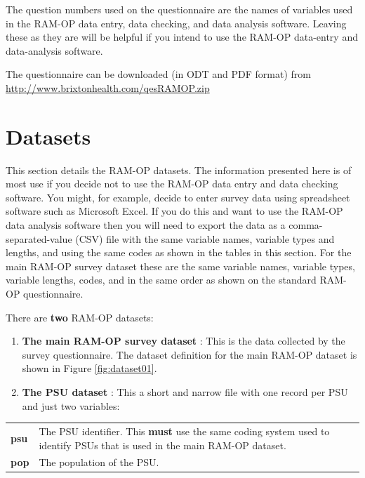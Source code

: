 \documentclass[12pt,a4paper]{book}
\theoremstyle{definition}
\theoremstyle{definition}
\theoremstyle{definition}
\theoremstyle{remark}
\begin{document}
The question numbers used on the questionnaire are the names of
variables used in the RAM-OP data entry, data checking, and data
analysis software. Leaving these as they are will be helpful if you
intend to use the RAM-OP data-entry and data-analysis software.

The questionnaire can be downloaded (in ODT and PDF format) from
\url{http://www.brixtonhealth.com/qesRAMOP.zip}

\hypertarget{datasets}{%
\chapter{Datasets}\label{datasets}}

This section details the RAM-OP datasets. The information presented here
is of most use if you decide not to use the RAM-OP data entry and data
checking software. You might, for example, decide to enter survey data
using spreadsheet software such as Microsoft Excel. If you do this and
want to use the RAM-OP data analysis software then you will need to
export the data as a comma-separated-value (CSV) file with the same
variable names, variable types and lengths, and using the same codes as
shown in the tables in this section. For the main RAM-OP survey dataset
these are the same variable names, variable types, variable lengths,
codes, and in the same order as shown on the standard RAM-OP
questionnaire.

There are \textbf{two} RAM-OP datasets:

\begin{enumerate}
\def\labelenumi{\arabic{enumi}.}
\item
  \textbf{The main RAM-OP survey dataset} : This is the data collected
  by the survey questionnaire. The dataset definition for the main
  RAM-OP dataset is shown in Figure \ref{fig:dataset01}.
\item
  \textbf{The PSU dataset} : This a short and narrow file with one
  record per PSU and just two variables:
\end{enumerate}

\begin{longtable}[]{@{}ll@{}}
\toprule
\begin{minipage}[t]{0.11\columnwidth}\raggedright
\textbf{psu}\strut
\end{minipage} & \begin{minipage}[t]{0.83\columnwidth}\raggedright
The PSU identifier. This \textbf{must} use the same coding system used
to identify PSUs that is used in the main RAM-OP dataset.\strut
\end{minipage}\tabularnewline
\begin{minipage}[t]{0.11\columnwidth}\raggedright
\textbf{pop}\strut
\end{minipage} & \begin{minipage}[t]{0.83\columnwidth}\raggedright
The population of the PSU.\strut
\end{minipage}\tabularnewline
\bottomrule
\end{longtable}
\end{document}
